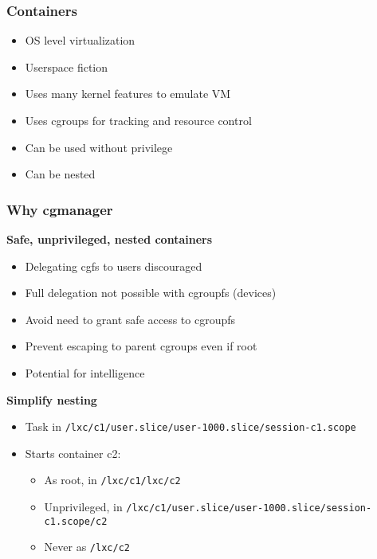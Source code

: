 \documentclass{beamer}
\begin{document}
\begin{frame}
\frametitle{Containers}
\begin{itemize}
\item OS level virtualization
\item Userspace fiction
\item Uses many kernel features to emulate VM
\item Uses cgroups for tracking and resource control
\item Can be used without privilege
\item Can be nested
\end{itemize}
\end{frame}

\begin{frame}
\frametitle{Why cgmanager}
\textbf{Safe, unprivileged, nested containers}
\begin{itemize}
\item Delegating cgfs to users discouraged
\item Full delegation not possible with cgroupfs (devices)
\item Avoid need to grant safe access to cgroupfs
\item Prevent escaping to parent cgroups even if root
\item Potential for intelligence
\end{itemize}
\textbf{Simplify nesting}
\begin{itemize}
\item Task in {\tt /lxc/c1/user.slice/user-1000.slice/session-c1.scope}
\item Starts container c2:
	\begin{itemize}
	\item As root, in {\tt /lxc/c1/lxc/c2}
	\item Unprivileged, in {\tt/lxc/c1/user.slice/user-1000.slice/session-c1.scope/c2}
	\item Never as {\tt /lxc/c2}
	\end{itemize}
\end{itemize}
\end{frame}
\end{document}
